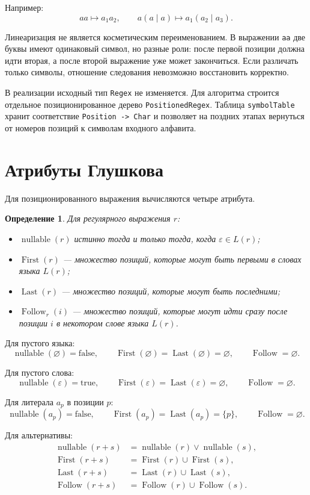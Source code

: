 \documentclass[12pt,a4paper]{article}
\newtheorem{definition}{Определение}
\newcommand{\nullable}{\operatorname{nullable}}
\newcommand{\First}{\operatorname{First}}
\newcommand{\Last}{\operatorname{Last}}
\newcommand{\Follow}{\operatorname{Follow}}
\begin{document}
Например:
\[
aa \mapsto a_1a_2,
\qquad
a(a \mid a) \mapsto a_1(a_2 \mid a_3).
\]

Линеаризация не является косметическим переименованием. В выражении \verb|aa|
две буквы имеют одинаковый символ, но разные роли: после первой позиции должна
идти вторая, а после второй выражение уже может закончиться. Если различать
только символы, отношение следования невозможно восстановить корректно.

В реализации исходный тип \verb|Regex| не изменяется. Для алгоритма строится
отдельное позиционированное дерево \verb|PositionedRegex|. Таблица
\verb|symbolTable| хранит соответствие \verb|Position -> Char| и позволяет на
поздних этапах вернуться от номеров позиций к символам входного алфавита.

\section{Атрибуты Глушкова}

Для позиционированного выражения вычисляются четыре атрибута.

\begin{definition}
Для регулярного выражения $r$:
\begin{itemize}
  \item $\nullable(r)$ истинно тогда и только тогда, когда
  $\varepsilon \in L(r)$;
  \item $\First(r)$ --- множество позиций, которые могут быть первыми в словах
  языка $L(r)$;
  \item $\Last(r)$ --- множество позиций, которые могут быть последними;
  \item $\Follow_r(i)$ --- множество позиций, которые могут идти сразу после
  позиции $i$ в некотором слове языка $L(r)$.
\end{itemize}
\end{definition}

Для пустого языка:
\[
\nullable(\varnothing)=\mathrm{false},\qquad
\First(\varnothing)=\Last(\varnothing)=\varnothing,\qquad
\Follow=\varnothing.
\]

Для пустого слова:
\[
\nullable(\varepsilon)=\mathrm{true},\qquad
\First(\varepsilon)=\Last(\varepsilon)=\varnothing,\qquad
\Follow=\varnothing.
\]

Для литерала $a_p$ в позиции $p$:
\[
\nullable(a_p)=\mathrm{false},\qquad
\First(a_p)=\Last(a_p)=\{p\},\qquad
\Follow=\varnothing.
\]

Для альтернативы:
\[
\begin{aligned}
\nullable(r+s) &= \nullable(r)\lor\nullable(s),\\
\First(r+s) &= \First(r)\cup\First(s),\\
\Last(r+s) &= \Last(r)\cup\Last(s),\\
\Follow(r+s) &= \Follow(r)\cup\Follow(s).
\end{aligned}
\]
\end{document}
